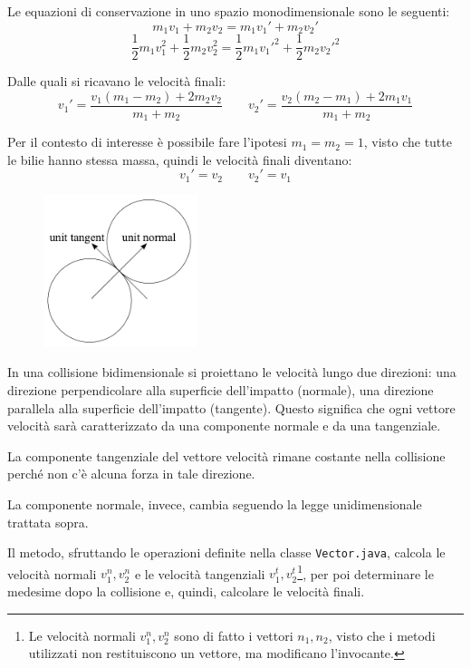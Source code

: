 \documentclass[12pt,a4paper]{report}
\begin{document}
Le equazioni di conservazione in uno spazio monodimensionale sono le seguenti:
\[m_1v_1 + m_2v_2 = m_1v_1' + m_2v_2'\]
\[\frac{1}{2}m_1v_1^2 + \frac{1}{2}m_2v_2^2 = \frac{1}{2}m_1v_1'^2 + \frac{1}{2}m_2v_2'^2\]

Dalle quali si ricavano le velocità finali:
\[v_1' = \frac{v_1(m_1 - m_2) + 2m_2v_2}{m_1 + m_2} \qquad v_2' = \frac{v_2(m_2 - m_1) + 2m_1v_1}{m_1 + m_2}\]

Per il contesto di interesse è possibile fare l'ipotesi $m_1 = m_2 = 1$, visto che tutte le bilie hanno stessa massa, quindi le velocità finali diventano:
\[v_1' = v_2 \qquad v_2' = v_1\]

\begin{figure}
  \begin{center}
  \includegraphics[width=0.4\textwidth]{2DCollision.png}
  \end{center}

\end{figure}

In una collisione bidimensionale si proiettano le velocità lungo due direzioni: una direzione perpendicolare alla superficie dell'impatto (normale), una direzione parallela alla superficie dell'impatto (tangente).
Questo significa che ogni vettore velocità sarà caratterizzato da una componente normale e da una tangenziale.

La componente tangenziale del vettore velocità rimane costante nella collisione perché non c'è alcuna forza in tale direzione.

La componente normale, invece, cambia seguendo la legge unidimensionale trattata sopra.

\vspace{3mm}

Il metodo, sfruttando le operazioni definite nella classe \texttt{Vector.java}, calcola le velocità normali $v_1^n, v_2^n$ e le velocità tangenziali $v_1^t, v_2^t$\footnote{Le velocità normali $v_1^n, v_2^n$ sono di fatto i vettori $n_1, n_2$, visto che i metodi utilizzati non restituiscono un vettore, ma modificano l'invocante.}, per poi determinare le medesime dopo la collisione e, quindi, calcolare le velocità finali.
\end{document}
